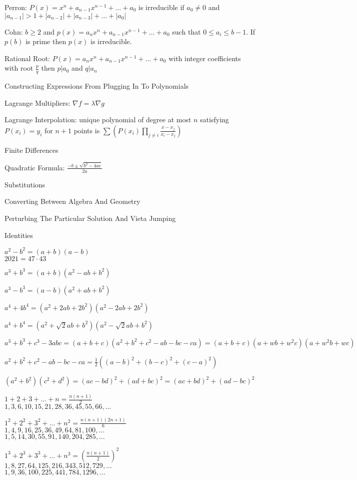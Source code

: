 Perron: $P(x)=x^n+a_{n-1}x^{n-1}+\dots +a_0$ is irreducible if $a_0 \neq 0$ and $|a_{n-1}| > 1 + |a_{n-2}| + |a_{n-3}| + \dots + |a_0|$

Cohn: $b \ge 2$ and $p(x)=a_n x^n + a_{n-1} x^{n-1} + \dots +a_0$ such that $0 \le a_i \le b-1$. If $p(b)$ is prime then $p(x)$ is irreducible.

Rational Root: $P(x)=a_n x^n+a_{n-1}x^{n-1}+\dots +a_0$ with integer coefficients with root $\frac{p}{q}$ then $p | a_0$ and $q | a_n$

Constructing Expressions From Plugging In To Polynomials

Lagrange Multipliers: $\nabla f = \lambda \nabla g$

Lagrange Interpolation: unique polynomial of degree at most $n$ satisfying $P(x_i)=y_i$ for $n+1$ points is $\sum \left(P(x_i)\prod_{j \neq i}\frac{x-x_j}{x_i-x_j} \right)$

Finite Differences

Quadratic Formula: $\frac{-b \pm \sqrt{b^2-4ac}}{2a}$

Substitutions

Converting Between Algebra And Geometry

Perturbing The Particular Solution And Vieta Jumping

Identities

$a^2-b^2=(a+b)(a-b)$ \\
$2021=47 \cdot 43$

$a^3+b^3=(a+b)(a^2-ab+b^2)$

$a^3-b^3=(a-b)(a^2+ab+b^2)$

$a^4+4b^4=(a^2+2ab+2b^2)(a^2-2ab+2b^2)$

$a^4+b^4=(a^2+\sqrt{2}ab+b^2)(a^2-\sqrt{2}ab+b^2)$

$a^3+b^3+c^3-3abc=(a+b+c)(a^2+b^2+c^2-ab-bc-ca)=(a+b+c)(a+wb+w^2c)(a+w^2b+wc)$

$a^2+b^2+c^2-ab-bc-ca=\frac{1}{2}((a-b)^2+(b-c)^2+(c-a)^2)$

$(a^2+b^2)(c^2+d^2)=(ac-bd)^2+(ad+bc)^2=(ac+bd)^2+(ad-bc)^2$

$1+2+3+\dots+n = \frac{n(n+1)}{2}$ \\
$1,3,6,10,15,21,28,36,45,55,66,\dots$

$1^2+2^2+3^2+\dots+n^2 = \frac{n(n+1)(2n+1)}{6}$ \\
$1,4,9,16,25,36,49,64,81,100,\dots$ \\
$1,5,14,30,55,91,140,204,285,\dots$

$1^3+2^3+3^3+\dots+n^3 = \left( \frac{n(n+1)}{2} \right)^2$ \\
$1,8,27,64,125,216,343,512,729,\dots$ \\
$1,9,36,100,225,441,784,1296,\dots$


